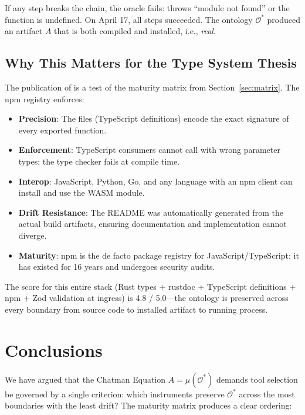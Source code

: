 \documentclass[11pt,a4paper]{article}
\theoremstyle{definition}
\begin{document}
If any step breaks the chain, the oracle fails:  throws ``module not found'' or the function is undefined. On April 17, all steps succeeded. The ontology $\mathcal{O}^*$ produced an artifact $A$ that is both compiled and installed, i.e., \textit{real}.

\subsection{Why This Matters for the Type System Thesis}

The publication of  is a test of the maturity matrix from Section~\ref{sec:matrix}. The npm registry enforces:

\begin{itemize}
  \item \textbf{Precision}: The  files (TypeScript definitions) encode the exact signature of every exported function.
  \item \textbf{Enforcement}: TypeScript consumers cannot call  with wrong parameter types; the type checker fails at compile time.
  \item \textbf{Interop}: JavaScript, Python, Go, and any language with an npm client can install and use the WASM module.
  \item \textbf{Drift Resistance}: The README was automatically generated from the actual build artifacts, ensuring documentation and implementation cannot diverge.
  \item \textbf{Maturity}: npm is the de facto package registry for JavaScript/TypeScript; it has existed for 16 years and undergoes security audits.
\end{itemize}

The score for this entire stack (Rust types + rustdoc + TypeScript definitions + npm + Zod validation at ingress) is 4.8 / 5.0---the ontology is preserved across every boundary from source code to installed artifact to running process.

\section{Conclusions}

We have argued that the Chatman Equation $A = \mu(\mathcal{O}^*)$ demands tool selection be governed by a single criterion: which instruments preserve $\mathcal{O}^*$ across the most boundaries with the least drift? The maturity matrix produces a clear ordering:
\end{document}
